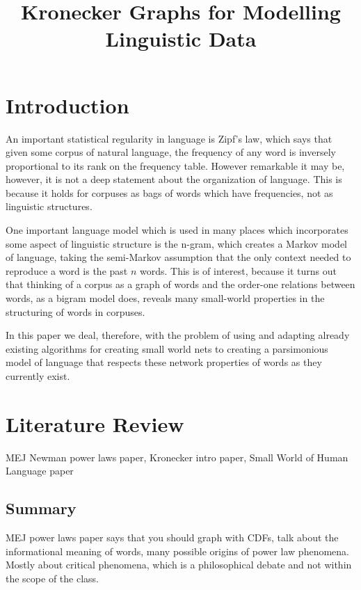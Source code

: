 \documentclass[12pt]{article}
\begin{document}
\title{Kronecker Graphs for Modelling Linguistic Data}

\section{Introduction}

An important statistical regularity in language is Zipf's law, which says that given some corpus of natural language, the frequency of any word is inversely proportional to its rank on the frequency table. However remarkable it may be, however, it is not a deep statement about the organization of language. This is because it holds for corpuses as bags of words which have frequencies, not as linguistic structures. %

One important language model which is used in many places which incorporates some aspect of linguistic structure is the n-gram, which creates a Markov model of language, taking the semi-Markov assumption that the only context needed to reproduce a word is the past $n$ words. This is of interest, because it turns out that thinking of a corpus as a graph of words and the order-one relations between words, as a bigram model does, reveals many small-world properties in the structuring of words in corpuses. %

In this paper we deal, therefore, with the problem of using and adapting already existing algorithms for creating small world nets to creating a parsimonious model of language that respects these network properties of words as they currently exist.

\section{Literature Review}

MEJ Newman power laws paper, Kronecker intro paper, Small World of Human Language paper

\subsection{Summary}
MEJ power laws paper says that you should graph with CDFs, talk about the informational meaning of words, many possible origins of power law phenomena. Mostly about critical phenomena, which is a philosophical debate and not within the scope of the class.
\end{document}
